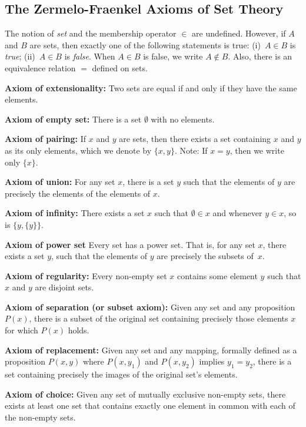 \subsection{The Zermelo-Fraenkel Axioms of Set Theory}

The notion of \textit{set} and the membership operator $\in$
are undefined.  However, if $A$ and $B$ are sets, then
exactly one of the following statements is true: 
(i)~$A\in B$ is \textit{true}; (ii)~$A\in B$ is \textit{false}.  
When $A\in B$ is false, we write $A\notin B$. Also, there 
is an equivalence relation $=$ defined on sets.

\medskip
\noindent
\textbf{Axiom of extensionality:}\quad
Two sets are equal if and only if they have the same elements. 
 
\medskip
\noindent
\textbf{Axiom of empty set:}\quad
There is a set $\emptyset$ with no elements. 
 
\medskip
\noindent
\textbf{Axiom of pairing:}\quad 
If $x$ and $y$ are sets, then there exists a set containing $x$ and $y$ 
as its only elements, which we denote by $\{x,y\}$.  Note: If
$x=y$, then we write only $\{x\}$.
 
\medskip
\noindent
\textbf{Axiom of union:}\quad 
For any set $x$, there is a set $y$ such that the elements of $y$ 
are precisely the elements of the elements of $x$. 
 
\medskip
\noindent
\textbf{Axiom of infinity:}\quad 
There exists a set $x$ such that $\emptyset\in x$ and whenever 
$y\in x$, so is $\{y ,\{y\}\}$. 
 
\medskip
\noindent
\textbf{Axiom of power set}\quad 
Every set has a power set. That is, for any set $x$, 
there exists a set $y$, such that the elements of $y$ are 
precisely the subsets of~$x$. 
 
\medskip
\noindent
\textbf{Axiom of regularity:}\quad 
Every non-empty set $x$ contains some element $y$ such that 
$x$ and $y$ are disjoint sets. 
 
\medskip
\noindent
\textbf{Axiom of separation (or subset axiom):}\quad 
Given any set and any proposition $P(x)$, there is a subset 
of the original set containing precisely those elements $x$ 
for which $P(x)$ holds. 
 
\medskip
\noindent
\textbf{Axiom of replacement:}\quad
Given any set and any mapping, formally defined as a 
proposition $P(x,y)$ where $P(x,y_1)$ and $P(x,y_2)$ implies 
$y_1 = y_2$, there is a set containing precisely the images 
of the original set's elements. 
 
\medskip
\noindent
\textbf{Axiom of choice:}\quad 
Given any set of mutually exclusive non-empty sets, there 
exists at least one set that contains exactly one element in 
common with each of the non-empty sets. 

